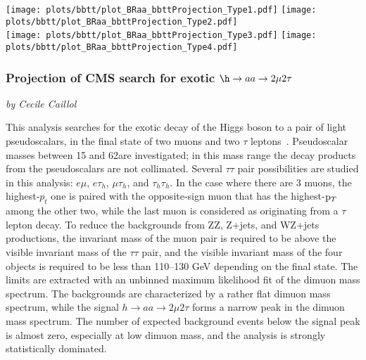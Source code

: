 \begin{figure*}[hbpt]
\centering
        \texttt{[image: plots/bbtt/plot\_BRaa\_bbttProjection\_Type1.pdf]}
        \texttt{[image: plots/bbtt/plot\_BRaa\_bbttProjection\_Type2.pdf]} \\
        \texttt{[image: plots/bbtt/plot\_BRaa\_bbttProjection\_Type3.pdf]}
        \texttt{[image: plots/bbtt/plot\_BRaa\_bbttProjection\_Type4.pdf]}
    \caption{Expected upper limits on $(\sigma(h)/\sigma_{\textrm{SM}}) \mathcal{B}(h\to aa)$ for 3000\fbinv of data with YR18 systematic uncertainties for the $2b 2\tau$ final state in 2HDM+S type-1 (top left), type-2 (top right), type-3 (bottom left), and type-4 (bottom right).}
    \label{fig:summary_bbtt}
\end{figure*}


\subsubsection{Projection of CMS search for exotic $\h\to aa \to 2\mu 2\tau$}
\begin{center}
 {\it{ by Cecile Caillol}}
\end{center}


This analysis searches for the exotic decay of the Higgs boson to a pair of light pseudoscalars, in the
final state of two muons and two $\tau$ leptons~\cite{Sirunyan:2018mbx}. Pseudoscalar
masses between 15 and 62\GeV are investigated; in this mass range the decay products from the pseudoscalars are
not collimated.
Several $\tau\tau$ pair possibilities are studied in this analysis: $e\mu$, $e\tau_h$,
$\mu\tau_h$, and $\tau_h\tau_h$. In the case where there are 3 muons, the highest-$p_t$ one is paired with
the opposite-sign muon that has the highest-$\mathrm{p}_{T}$ among the other two, while the last muon is considered as
originating from a $\tau$ lepton decay.
To reduce the backgrounds from ZZ, Z+jets, and WZ+jets productions, the invariant mass of the muon pair
is required to be above the visible invariant mass of the $\tau\tau$ pair, and the
visible invariant mass of the four objects is required to be less than 110--130 GeV depending on the final state.
The limits are extracted with an unbinned maximum likelihood fit of the dimuon mass spectrum.
The backgrounds are characterized by a rather flat dimuon mass spectrum, while the signal $h\to aa \to 2\mu2\tau$
forms a narrow peak in the dimuon mass spectrum.
The number of expected background events below the signal peak is almost zero,
especially at low dimuon mass, and the analysis is strongly statistically dominated.

